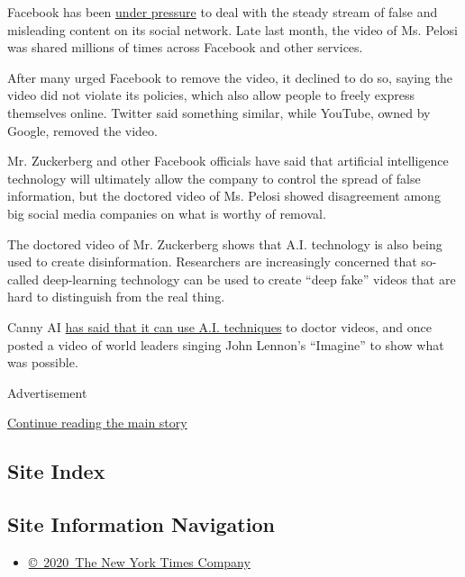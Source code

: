Facebook has been
\href{https://www.nytimes.com/2019/05/17/technology/facebook-ai-schroepfer.html}{under
pressure} to deal with the steady stream of false and misleading content
on its social network. Late last month, the video of Ms. Pelosi was
shared millions of times across Facebook and other services.

After many urged Facebook to remove the video, it declined to do so,
saying the video did not violate its policies, which also allow people
to freely express themselves online. Twitter said something similar,
while YouTube, owned by Google, removed the video.

Mr. Zuckerberg and other Facebook officials have said that artificial
intelligence technology will ultimately allow the company to control the
spread of false information, but the doctored video of Ms. Pelosi showed
disagreement among big social media companies on what is worthy of
removal.

The doctored video of Mr. Zuckerberg shows that A.I. technology is also
being used to create disinformation. Researchers are increasingly
concerned that so-called deep-learning technology can be used to create
``deep fake'' videos that are hard to distinguish from the real thing.

Canny AI
\href{https://www.fxguide.com/featured/canny-ai-imagine-world-leaders-singing/}{has
said that it can use A.I. techniques} to doctor videos, and once posted
a video of world leaders singing John Lennon's ``Imagine'' to show what
was possible.

Advertisement

\protect\hyperlink{after-bottom}{Continue reading the main story}

\hypertarget{site-index}{%
\subsection{Site Index}\label{site-index}}

\hypertarget{site-information-navigation}{%
\subsection{Site Information
Navigation}\label{site-information-navigation}}

\begin{itemize}
\tightlist
\item
  \href{https://help.nytimes.com/hc/en-us/articles/115014792127-Copyright-notice}{©~2020~The
  New York Times Company}
\end{itemize}

